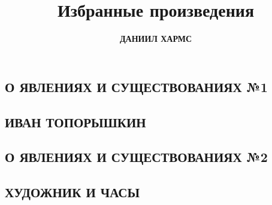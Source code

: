 \documentclass[a4paper]{book}
\begin{document}
\title{\textbf{Избранные произведения}}
\author{\textbf{ДАНИИЛ ХАРМС}}
\date{}
\maketitle

\begin{center}
\chapter*{О ЯВЛЕНИЯХ И СУЩЕСТВОВАНИЯХ №1}
\end{center}


\begin{center}
\chapter*{ИВАН ТОПОРЫШКИН}
\end{center}


\begin{center}
\chapter*{О ЯВЛЕНИЯХ И СУЩЕСТВОВАНИЯХ №2}
\end{center}


\begin{center}
\chapter*{ХУДОЖНИК И ЧАСЫ}
\end{center}

\end{document}

